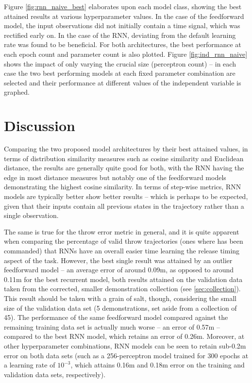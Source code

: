 \documentclass{article}
\begin{document}
Figure \ref{fig:rnn_naive_best} elaborates upon each model class, showing the best attained results at various hyperparameter values. In the case of the feedforward model, the input observations did not initially contain a time signal, which was rectified early on. In the case of the RNN, deviating from the default learning rate was found to be beneficial. For both architectures, the best performance at each epoch count and parameter count is also plotted. Figure \ref{fig:ind_rnn_naive} shows the impact of only varying the crucial size (perceptron count) -- in each case the two best performing models at each fixed parameter combination are selected and their performance at different values of the independent variable is graphed. 

\section{Discussion}
\label{sec:discussion}

Comparing the two proposed model architectures by their best attained values, in terms of distribution similarity measures such as cosine similarity and Euclidean distance, the results are generally quite good for both, with the RNN having the edge in most distance measures but notably one of the feedforward models demonstrating the highest cosine similarity. In terms of step-wise metrics, RNN models are typically better show better results -- which is perhaps to be expected, given that their inputs contain all previous states in the trajectory rather than a single observation. 

The same is true for the throw error metric in general, and it is quite apparent when comparing the percentage of valid throw trajectories (ones where has been commanded) that RNNs have an overall easier time learning the release timing aspect of the task. However, the best single result was attained by an outlier feedforward model -- an average error of around 0.09m, as opposed to around 0.11m for the best recurrent model, both results attained on the validation data taken from the corrected, smaller demonstration collection (see \ref{sec:collection}). This result should be taken with a grain of salt, though, considering the small size of the validation data set (5 demonstrations, set aside from a collection of 45). The performance of the same feedforward model compared against the remaining training data set is actually much worse -- an error of 0.57m -- compared to the best RNN model, which retains an error of 0.26m. Moreover, at other hyperparameter combinations, RNN models can be seen to retain sub-0.2m error on both data sets (such as a 256-perceptron model trained for 300 epochs at a learning rate of $10^{-3}$, which attains 0.16m and 0.18m error on the training and validation data sets, respectively).
\end{document}
